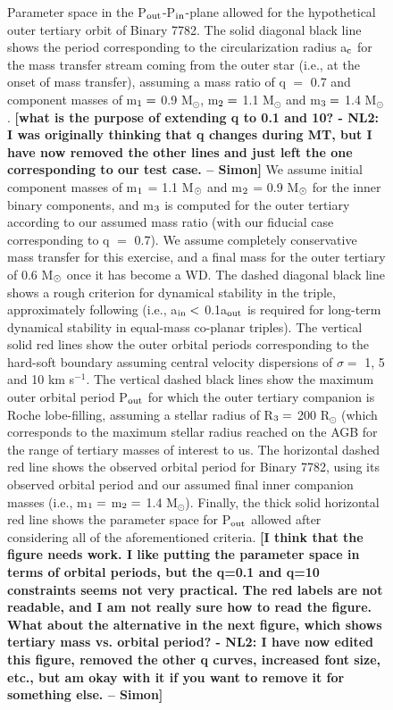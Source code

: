 \documentclass{aastex62}
\def\simon#1{{\bf {\color{red}[#1 -- Simon]}}}
\begin{document}
\begin{figure}[ht!]
\caption{Parameter space in the P$_{\rm out}$-P$_{\rm in}$-plane
  allowed for the hypothetical outer tertiary orbit of Binary 7782.
  The solid diagonal black line shows the period corresponding to the
  circularization radius a$_{\rm c}$ for the mass transfer stream
  coming from the outer star (i.e., at the onset of mass transfer), assuming a mass ratio of q $=$ 0.7 and component masses 
  of m$_{\rm 1} =$ 0.9 M$_{\odot}$, m$_{\rm 2} =$ 1.1 M$_{\odot}$ and 
  m$_{\rm 3} =$ 1.4 M$_{\odot}$. \simon{what is the purpose of extending q to 0.1 and
    10? - NL2: I was originally thinking that q changes during MT, but I have now removed the other lines and just left the one corresponding to our test case.} We assume initial component masses of m$_{\rm 1}$ = 1.1
  M$_{\rm \odot}$ and m$_{\rm 2}$ = 0.9 M$_{\rm \odot}$ for the inner
  binary components, and m$_{\rm 3}$ is computed for the outer
  tertiary according to our assumed mass ratio (with our fiducial case
  corresponding to q $=$ 0.7).  We assume completely conservative mass
  transfer for this exercise, and a final mass for the outer tertiary
  of 0.6 M$_{\rm \odot}$ once it has become a WD.  The dashed diagonal
  black line shows a rough criterion for dynamical stability in the
  triple, approximately following \citet{mardling99} (i.e., a$_{\rm
    in} <$ 0.1a$_{\rm out}$ is required for long-term dynamical
  stability in equal-mass co-planar triples).  The vertical solid red
  lines show the outer orbital periods corresponding to the hard-soft
  boundary assuming central velocity dispersions of $\sigma =$ 1, 5
  and 10 km s$^{-1}$.  The vertical dashed black lines show the
  maximum outer orbital period P$_{\rm out}$ for which the outer
  tertiary companion is Roche lobe-filling, assuming a stellar radius
  of R$_{\rm 3} =$ 200 R$_{\odot}$ (which corresponds to the maximum stellar radius reached on the AGB for the range of tertiary masses of interest to us.  The horizontal dashed red line shows the observed
  orbital period for Binary 7782, using its observed orbital period
  and our assumed final inner companion masses (i.e., m$_{\rm 1} =$
  m$_{\rm 2} =$ 1.4 M$_{\odot}$).  Finally, the thick solid horizontal
  red line shows the parameter space for P$_{\rm out}$ allowed after
  considering all of the aforementioned criteria.  \simon{I think that
    the figure needs work. I like putting the parameter space in terms
    of orbital periods, but the q=0.1 and q=10 constraints seems
    not very practical. The red labels are not readable, and I am not
    really sure how to read the figure. What about the alternative in
    the next figure, which shows tertiary mass vs. orbital period? - NL2: I have now edited this figure, removed the other q curves, increased font size, etc., but am okay with it if you want to remove it for something else.}
\label{fig:fig2}}
\end{figure}
\end{document}
